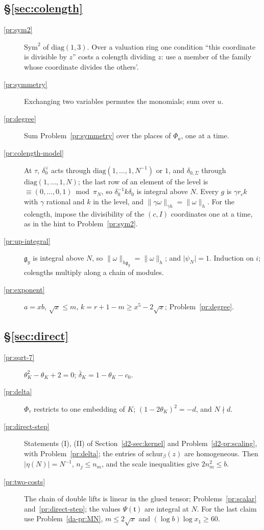 \documentclass[reqno]{amsart}
\theoremstyle{plain}
\theoremstyle{definition}
\theoremstyle{remark}
\newcommand{\nb}[1]{\lVert #1 \rVert}
\begin{document}
\subsection*{\S\ref{sec:colength}}
\begin{description}
\item[\ref{pr:sym2}] \(\mathrm{Sym}^2\) of \(\mathrm{diag}(1, 3)\).  Over a valuation ring one condition ``this coordinate is divisible by \(z\)'' costs a colength dividing \(z\): use a member of the family whose coordinate divides the others'.
\item[\ref{pr:symmetry}] Exchanging two variables permutes the monomials; sum over \(u\).
\item[\ref{pr:degree}] Sum Problem~\ref{pr:symmetry} over the places of \(\Phi_a\), one at a time.
\item[\ref{pr:colength-model}] At \(\tau\), \(\delta_0^\vee\) acts through \(\mathrm{diag}(1, \dots, 1, N^{-1})\) or \(1\), and \(\delta_{0,\Sigma}\) through \(\mathrm{diag}(1, \dots, 1, N)\); the last row of an element of the level is \(\equiv (0, \dots, 0, 1) \bmod \pi_N\), so \(\delta_0^{-1}k\delta_0\) is integral above \(N\).  Every \(g\) is \(\gamma r_ck\) with \(\gamma\) rational and \(k\) in the level, and \(\nb{\gamma\omega}_{\gamma h} = \nb{\omega}_h\).  For the colength, impose the divisibility of the \((c, I)\) coordinates one at a time, as in the hint to Problem~\ref{pr:sym2}.
\item[\ref{pr:up-integral}] \(\mathfrak g_y\) is integral above \(N\), so \(\nb{\omega}_{h\mathfrak g_y} = \nb{\omega}_h\); and \(\lvert\psi_N\rvert = 1\).  Induction on \(i\); colengths multiply along a chain of modules.
\item[\ref{pr:exponent}] \(a = xb\), \(\sqrt x \le m\), \(k = r + 1 - m \ge x^5 - 2\sqrt x\); Problem~\ref{pr:degree}.
\end{description}

\subsection*{\S\ref{sec:direct}}
\begin{description}
\item[\ref{pr:sqrt-7}] \(\theta_K^2 - \theta_K + 2 = 0\); \(\bar{\delta}_K = 1 - \theta_K - c_0\).
\item[\ref{pr:delta}] \(\Phi_\tau\) restricts to one embedding of \(K\); \((1 - 2\theta_K)^2 = -d\), and \(N \nmid d\).
\item[\ref{pr:direct-step}] Statements (I), (II) of Section~\ref{d2-sec:kernel} and Problem~\ref{d2-pr:scaling}, with Problem~\ref{pr:delta}; the entries of \(\mathrm{schur}_\beta(z)\) are homogeneous.  Then \(\lvert\eta(N)\rvert = N^{-1}\), \(n_j \le n_m\), and the scale inequalities give \(2n_m^2 \le b\).
\item[\ref{pr:two-costs}] The chain of double lifts is linear in the glued tensor; Problems~\ref{pr:scalar} and~\ref{pr:direct-step}; the values \(\Psi(\mathfrak t)\) are integral at \(N\).  For the last claim use Problem~\ref{da-pr:MN}, \(m \le 2\sqrt x\) and \((\log b)\log x_1 \ge 60\).
\end{description}
\end{document}
